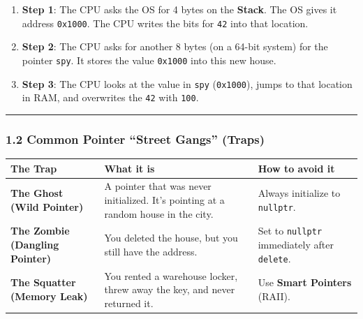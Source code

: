 \begin{enumerate}
\def\labelenumi{\arabic{enumi}.}
\tightlist
\item
  \textbf{Step 1}: The CPU asks the OS for 4 bytes on the
  \textbf{Stack}. The OS gives it address
  \passthrough{\lstinline!0x1000!}. The CPU writes the bits for
  \passthrough{\lstinline!42!} into that location.
\item
  \textbf{Step 2}: The CPU asks for another 8 bytes (on a 64-bit system)
  for the pointer \passthrough{\lstinline!spy!}. It stores the value
  \passthrough{\lstinline!0x1000!} into this new house.
\item
  \textbf{Step 3}: The CPU looks at the value in
  \passthrough{\lstinline!spy!} (\passthrough{\lstinline!0x1000!}),
  jumps to that location in RAM, and overwrites the
  \passthrough{\lstinline!42!} with \passthrough{\lstinline!100!}.
\end{enumerate}

\begin{center}\rule{0.5\linewidth}{0.5pt}\end{center}

\hypertarget{common-pointer-street-gangs-traps}{%
\subsubsection{1.2 Common Pointer ``Street Gangs''
(Traps)}\label{common-pointer-street-gangs-traps}}

\begin{longtable}[]{@{}
  >{\raggedright\arraybackslash}p{}
  >{\raggedright\arraybackslash}p{}
  >{\raggedright\arraybackslash}p{}@{}}
\toprule
The Trap & What it is & How to avoid it \\
\midrule
\endhead
\textbf{The Ghost (Wild Pointer)} & A pointer that was never
initialized. It's pointing at a random house in the city. & Always
initialize to \passthrough{\lstinline!nullptr!}. \\
\textbf{The Zombie (Dangling Pointer)} & You deleted the house, but you
still have the address. & Set to \passthrough{\lstinline!nullptr!}
immediately after \passthrough{\lstinline!delete!}. \\
\textbf{The Squatter (Memory Leak)} & You rented a warehouse locker,
threw away the key, and never returned it. & Use \textbf{Smart Pointers}
(RAII). \\
\bottomrule
\end{longtable}

